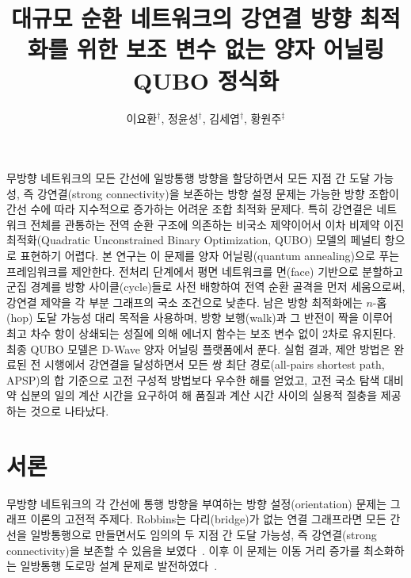\documentclass[twocolumn,a4paper]{article}
\begin{document}
\title{대규모 순환 네트워크의 강연결 방향 최적화를 위한 보조 변수 없는 양자 어닐링 QUBO 정식화}
\author{이요환${}^\dag$, 정윤성${}^\dag$, 김세엽${}^\dag$, 황원주${}^\ddag$}
\address{\dag 부산대학교 정보컴퓨터공학부 \\
\ddag 부산대학교 정보융합공학과 \\
대한민국 부산광역시 46241 \\
Email: , , , }
\maketitle

\abstract
무방향 네트워크의 모든 간선에 일방통행 방향을 할당하면서 모든 지점 간 도달 가능성, 즉 강연결(strong connectivity)을 보존하는 방향 설정 문제는 가능한 방향 조합이 간선 수에 따라 지수적으로 증가하는 어려운 조합 최적화 문제다. 특히 강연결은 네트워크 전체를 관통하는 전역 순환 구조에 의존하는 비국소 제약이어서 이차 비제약 이진 최적화(Quadratic Unconstrained Binary Optimization, QUBO) 모델의 페널티 항으로 표현하기 어렵다. 본 연구는 이 문제를 양자 어닐링(quantum annealing)으로 푸는 프레임워크를 제안한다. 전처리 단계에서 평면 네트워크를 면(face) 기반으로 분할하고 군집 경계를 방향 사이클(cycle)들로 사전 배향하여 전역 순환 골격을 먼저 세움으로써, 강연결 제약을 각 부분 그래프의 국소 조건으로 낮춘다. 남은 방향 최적화에는 $n$-홉(hop) 도달 가능성 대리 목적을 사용하며, 방향 보행(walk)과 그 반전이 짝을 이루어 최고 차수 항이 상쇄되는 성질에 의해 에너지 함수는 보조 변수 없이 2차로 유지된다. 최종 QUBO 모델은 D-Wave 양자 어닐링 플랫폼에서 푼다. 실험 결과, 제안 방법은 완료된 전 시행에서 강연결을 달성하면서 모든 쌍 최단 경로(all-pairs shortest path, APSP)의 합 기준으로 고전 구성적 방법보다 우수한 해를 얻었고, 고전 국소 탐색 대비 약 십분의 일의 계산 시간을 요구하여 해 품질과 계산 시간 사이의 실용적 절충을 제공하는 것으로 나타났다.
\endabstract

\section{서론} \label{sec:intro}

무방향 네트워크의 각 간선에 통행 방향을 부여하는 방향 설정(orientation) 문제는 그래프 이론의 고전적 주제다. Robbins는 다리(bridge)가 없는 연결 그래프라면 모든 간선을 일방통행으로 만들면서도 임의의 두 지점 간 도달 가능성, 즉 강연결(strong connectivity)을 보존할 수 있음을 보였다~\cite{robbins1939theorem}. 이후 이 문제는 이동 거리 증가를 최소화하는 일방통행 도로망 설계 문제로 발전하였다~\cite{drezner1997selecting}.
\end{document}
